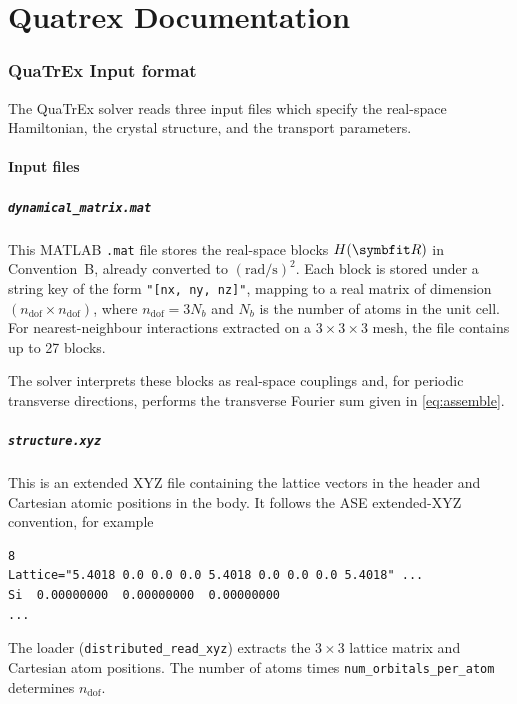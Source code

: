 \chapter{Quatrex Documentation}
\label{ch:quatrex_doc}

\subsection{QuaTrEx Input format}
\label{sec:quatrex_input}

The QuaTrEx solver reads three input files which
specify the real-space Hamiltonian, the crystal structure, and the
transport parameters.

\subsubsection{Input files}
\label{sec:input_files}

\paragraph{\texttt{dynamical\_matrix.mat}}
This MATLAB \texttt{.mat} file stores the real-space blocks
$H(\vc{R})$ in Convention~B, already converted to
$(\mathrm{rad/s})^2$.  Each block is stored under a string key of the
form \texttt{"[nx, ny, nz]"},
mapping to a real matrix of dimension
$(n_\mathrm{dof}\times n_\mathrm{dof})$, where
$n_\mathrm{dof}=3N_b$ and $N_b$ is the number of atoms in the unit
cell.  For nearest-neighbour interactions extracted on a
$3\times3\times3$ mesh, the file contains up to 27 blocks.

The solver interprets these blocks as real-space couplings and, for
periodic transverse directions, performs the transverse Fourier sum
given in \cref{eq:assemble}.

\paragraph{\texttt{structure.xyz}}
This is an extended XYZ file containing the lattice vectors in the
header and Cartesian atomic positions in the body.  It follows the ASE
extended-XYZ convention, for example
\begin{verbatim}
8
Lattice="5.4018 0.0 0.0 0.0 5.4018 0.0 0.0 0.0 5.4018" ...
Si  0.00000000  0.00000000  0.00000000
...
\end{verbatim}
The loader (\texttt{distributed\_read\_xyz}) extracts the $3\times3$
lattice matrix and Cartesian atom positions.  The number of atoms times
\texttt{num\_orbitals\_per\_atom} determines $n_\mathrm{dof}$.

